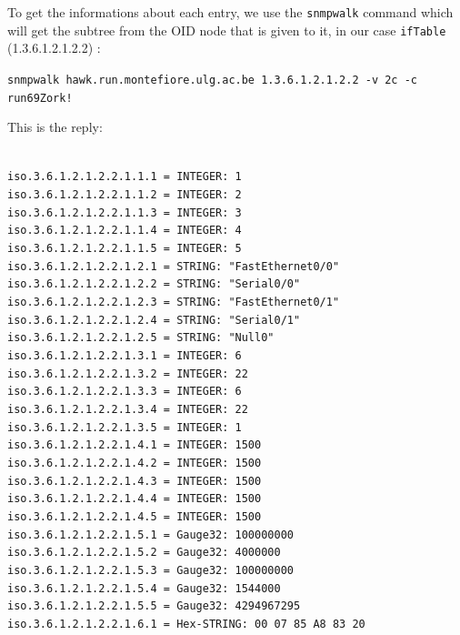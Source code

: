 \documentclass[a4paper,titlepage]{article}
\begin{document}
To get the informations about each entry, we use the \texttt{snmpwalk} command which will get the subtree from the OID node that is given to it, in our case \texttt{ifTable} (1.3.6.1.2.1.2.2) :
\begin{center}
	\texttt{snmpwalk hawk.run.montefiore.ulg.ac.be 1.3.6.1.2.1.2.2 -v 2c -c run69Zork!}
\end{center}
This is the reply: 
\begin{center}
	\texttt{\\iso.3.6.1.2.1.2.2.1.1.1 = INTEGER: 1
\\iso.3.6.1.2.1.2.2.1.1.2 = INTEGER: 2
\\iso.3.6.1.2.1.2.2.1.1.3 = INTEGER: 3
\\iso.3.6.1.2.1.2.2.1.1.4 = INTEGER: 4
\\iso.3.6.1.2.1.2.2.1.1.5 = INTEGER: 5
\\iso.3.6.1.2.1.2.2.1.2.1 = STRING: "FastEthernet0/0"
\\iso.3.6.1.2.1.2.2.1.2.2 = STRING: "Serial0/0"
\\iso.3.6.1.2.1.2.2.1.2.3 = STRING: "FastEthernet0/1"
\\iso.3.6.1.2.1.2.2.1.2.4 = STRING: "Serial0/1"
\\iso.3.6.1.2.1.2.2.1.2.5 = STRING: "Null0"
\\iso.3.6.1.2.1.2.2.1.3.1 = INTEGER: 6
\\iso.3.6.1.2.1.2.2.1.3.2 = INTEGER: 22
\\iso.3.6.1.2.1.2.2.1.3.3 = INTEGER: 6
\\iso.3.6.1.2.1.2.2.1.3.4 = INTEGER: 22
\\iso.3.6.1.2.1.2.2.1.3.5 = INTEGER: 1
\\iso.3.6.1.2.1.2.2.1.4.1 = INTEGER: 1500
\\iso.3.6.1.2.1.2.2.1.4.2 = INTEGER: 1500
\\iso.3.6.1.2.1.2.2.1.4.3 = INTEGER: 1500
\\iso.3.6.1.2.1.2.2.1.4.4 = INTEGER: 1500
\\iso.3.6.1.2.1.2.2.1.4.5 = INTEGER: 1500
\\iso.3.6.1.2.1.2.2.1.5.1 = Gauge32: 100000000
\\iso.3.6.1.2.1.2.2.1.5.2 = Gauge32: 4000000
\\iso.3.6.1.2.1.2.2.1.5.3 = Gauge32: 100000000
\\iso.3.6.1.2.1.2.2.1.5.4 = Gauge32: 1544000
\\iso.3.6.1.2.1.2.2.1.5.5 = Gauge32: 4294967295
\\iso.3.6.1.2.1.2.2.1.6.1 = Hex-STRING: 00 07 85 A8 83 20 
}
\end{center}
\end{document}
